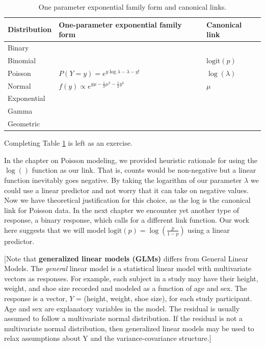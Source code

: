 \documentclass[
]{krantz}
\begin{document}
\begin{table}

\caption{\label{tab:table1chp5}One parameter exponential family form and canonical links.}
\centering
\begin{tabular}[t]{lll}
\toprule
Distribution & One-parameter exponential family form & Canonical link\\
\midrule
Binary &  & \\
Binomial &  & $\text{logit}(p)$\\
Poisson & $P(Y=y) = e^{y\log\lambda - \lambda - y!}$ & $\log(\lambda)$\\
Normal & $f(y) \propto e^{y\mu -\frac{1}{2}\mu^2 -\frac{1}{2}y^2}$ & $\mu$\\
Exponential &  & \\
\addlinespace
Gamma &  & \\
Geometric &  & \\
\bottomrule
\end{tabular}
\end{table}

Completing Table \ref{tab:table1chp5} is left as an exercise.

In the chapter on Poisson modeling, we provided heuristic rationale for using the \(\log()\) function as our link. That is, counts would be non-negative but a linear function inevitably goes negative. By taking the logarithm of our parameter \(\lambda\) we could use a linear predictor and not worry that it can take on negative values. Now we have theoretical justification for this choice, as the log is the canonical link for Poisson data. In the next chapter we encounter yet another type of response, a binary response, which calls for a different link function. Our work here suggests that we will model \(\text{logit}(p)=\log\left(\frac{p}{1-p}\right)\) using a linear predictor.

{[}Note that \textbf{generalized linear models (GLMs)} differs from General Linear Models. The \emph{general} linear model is a statistical linear model with multivariate vectors as responses. For example, each subject in a study may have their height, weight, and shoe size recorded and modeled as a function of age and sex. The response is a vector, \(Y\) = (height, weight, shoe size), for each study participant. Age and sex are explanatory variables in the model. The residual is usually assumed to follow a multivariate normal distribution. If the residual is not a multivariate normal distribution, then generalized linear models may be used to relax assumptions about Y and the variance-covariance structure.{]}
\end{document}
